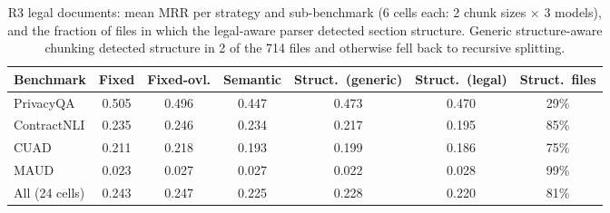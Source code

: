 \documentclass[runningheads]{llncs}
\begin{document}
\begin{table}[t]
\caption{R3 legal documents: mean MRR per strategy and sub-benchmark (6 cells each: 2 chunk sizes $\times$ 3 models), and the fraction of files in which the legal-aware parser detected section structure. Generic structure-aware chunking detected structure in 2 of the 714 files and otherwise fell back to recursive splitting.}
\label{tab:legal}
\centering
\footnotesize
\setlength{\tabcolsep}{3.5pt}
\begin{tabular}{lcccccc}
\toprule
Benchmark & Fixed & Fixed-ovl. & Semantic & Struct.\ (generic) & Struct.\ (legal) & Struct.\ files \\
\midrule
PrivacyQA   & 0.505 & 0.496 & 0.447 & 0.473 & 0.470 & 29\% \\
ContractNLI & 0.235 & 0.246 & 0.234 & 0.217 & 0.195 & 85\% \\
CUAD        & 0.211 & 0.218 & 0.193 & 0.199 & 0.186 & 75\% \\
MAUD        & 0.023 & 0.027 & 0.027 & 0.022 & 0.028 & 99\% \\
\midrule
All (24 cells) & 0.243 & 0.247 & 0.225 & 0.228 & 0.220 & 81\% \\
\bottomrule
\end{tabular}
\end{table}
\end{document}
